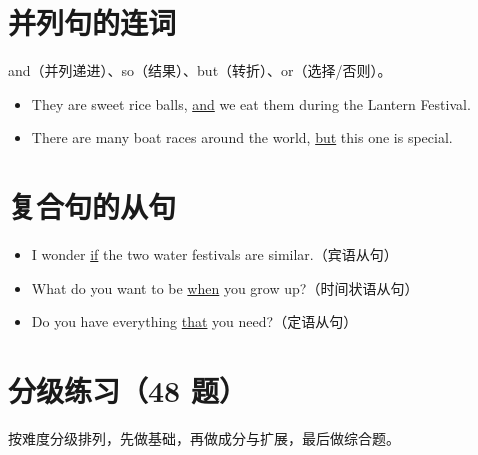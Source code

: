 \documentclass[11pt,a4paper]{ctexart}
\begin{document}
\section{并列句的连词}
and（并列递进）、so（结果）、but（转折）、or（选择/否则）。
\begin{itemize}[leftmargin=1.4em]
\item They are sweet rice balls, \underline{and} we eat them during the Lantern Festival.
\item There are many boat races around the world, \underline{but} this one is special.
\end{itemize}

\section{复合句的从句}
\begin{itemize}[leftmargin=1.4em]
\item I wonder \underline{if} the two water festivals are similar.（宾语从句）
\item What do you want to be \underline{when} you grow up?（时间状语从句）
\item Do you have everything \underline{that} you need?（定语从句）
\end{itemize}


\newpage
\section{分级练习（48 题）}
\noindent 按难度分级排列，先做基础，再做成分与扩展，最后做综合题。
\end{document}
